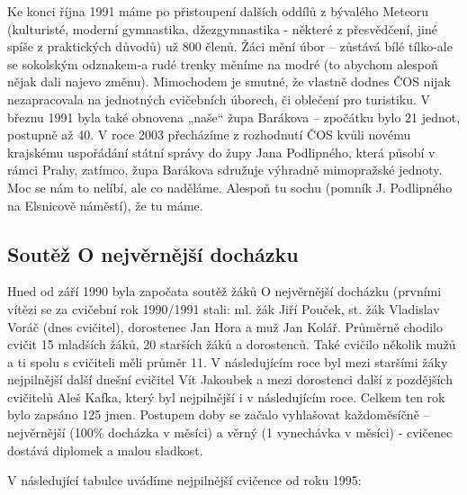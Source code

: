 Ke konci října 1991 máme po přistoupení dalších oddílů z bývalého
Meteoru (kulturisté, moderní gymnastika, džezgymnastika - některé z
přesvědčení, jiné spíše z praktických důvodů) už 800 členů. Žáci mění
úbor -- zůstává bílé tílko-ale se sokolským odznakem-a rudé trenky
měníme na modré (to abychom alespoň nějak dali najevo změnu). Mimochodem
je smutné, že vlastně dodnes ČOS nijak nezapracovala na jednotných
cvičebních úborech, či oblečení pro turistiku. V březnu 1991 byla také
obnovena „naše`` župa Barákova -- zpočátku bylo 21 jednot, postupně až
40. V roce 2003 přecházíme z rozhodnutí ČOS kvůli novému krajskému
uspořádání státní správy do župy Jana Podlipného, která působí v rámci
Prahy, zatímco, župa Barákova sdružuje výhradně mimopražské jednoty. Moc
se nám to nelíbí, ale co naděláme. Alespoň tu sochu (pomník J.
Podlipného na Elsnicově náměstí), že tu máme.

\subsection{Soutěž O nejvěrnější
docházku}\label{soutux11bux17e-o-nejvux11brnux11bjux161uxed-dochuxe1zku}

Hned od září 1990 byla započata soutěž žáků O nejvěrnější docházku
(prvními vítězi se za cvičební rok 1990/1991 stali: ml. žák Jiří Pouček,
st. žák Vladislav Voráč (dnes cvičitel), dorostenec Jan Hora a muž Jan
Kolář. Průměrně chodilo cvičit 15 mladších žáků, 20 starších žáků a
dorostenců. Také cvičilo několik mužů a ti spolu s cvičiteli měli průměr
11. V následujícím roce byl mezi staršími žáky nejpilnější další dnešní
cvičitel Vít Jakoubek a mezi dorostenci další z pozdějších cvičitelů
Aleš Kafka, který byl nejpilnější i v následujícím roce. Celkem ten rok
bylo zapsáno 125 jmen. Postupem doby se začalo vyhlašovat každoměsíčně
-- nejvěrnější (100\% docházka v měsíci) a věrný (1 vynechávka v měsíci)
- cvičenec dostává diplomek a malou sladkost.

V následující tabulce uvádíme nejpilnější cvičence od roku 1995:

